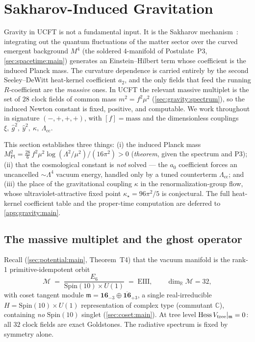 \section{Sakharov-Induced Gravitation}
\label{sec:gravity:main}

Gravity in UCFT is not a fundamental input. It is the Sakharov
mechanism~\cite{Sakharov:1967pk}: integrating out the quantum
fluctuations of the matter sector over the curved emergent background
$M^{4}$ (the soldered 4-manifold of Postulate~P3, \autoref{sec:spacetime:main})
generates an Einstein--Hilbert term whose coefficient is the induced
Planck mass. The curvature dependence is carried entirely by the
second Seeley--DeWitt heat-kernel coefficient $a_{2}$, and the only
fields that feed the running $R$-coefficient are the \emph{massive}
ones. In UCFT the relevant massive multiplet is the set of
$28$ clock fields of common mass $m^{2}=f^{2}\mu^{2}$
(\autoref{sec:gravity:spectrum}), so the induced Newton constant is
fixed, positive, and computable. We work throughout in signature
$(-,+,+,+)$, with $[f]=\text{mass}$ and the dimensionless couplings
$\xi,\ \hat g^{2},\ \hat y^{2},\ \kappa,\ \Lambda_{\mathrm{cc}}$.

This section establishes three things: (i) the induced Planck mass
$M_{\mathrm{Pl}}^{2}=\tfrac{28}{6}\,f^{2}\mu^{2}\log(\Lambda^{2}/\mu^{2})/(16\pi^{2})>0$
(\emph{theorem}, given the spectrum and P3); (ii) that the
cosmological constant is \emph{not} solved --- the $a_{0}$ coefficient
forces an uncancelled $\sim\Lambda^{4}$ vacuum energy, handled only by a
tuned counterterm $\Lambda_{\mathrm{cc}}$; and (iii) the place of the
gravitational coupling $\kappa$ in the renormalization-group flow, whose
ultraviolet-attractive fixed point $\kappa_{\star}=96\pi^{2}/5$ is
conjectural. The full heat-kernel coefficient table and the
proper-time computation are deferred to \autoref{app:gravity:main}.

\subsection{The massive multiplet and the ghost operator}
\label{sec:gravity:spectrum}

Recall (\autoref{sec:potential:main}, Theorem~T4) that the vacuum manifold
is the rank-1 primitive-idempotent orbit
\[
  \mathcal M \;=\; \frac{E_{6}}{\mathrm{Spin}(10)\times U(1)} \;=\; \mathrm{EIII},
  \qquad \dim_{\mathbb R}\mathcal M = 32,
\]
with coset tangent module
$\mathfrak m = \mathbf{16}_{-3}\oplus\overline{\mathbf{16}}_{+3}$, a single
real-irreducible $H=\mathrm{Spin}(10)\times U(1)$ representation of complex
type (commutant $\mathbb C$), containing \emph{no} $\mathrm{Spin}(10)$
singlet (\autoref{sec:coset:main}). At tree level
$\operatorname{Hess} V_{\mathrm{tree}}|_{\mathfrak m}=0$: all $32$ clock fields are exact
Goldstones. The radiative spectrum is fixed by symmetry alone.

